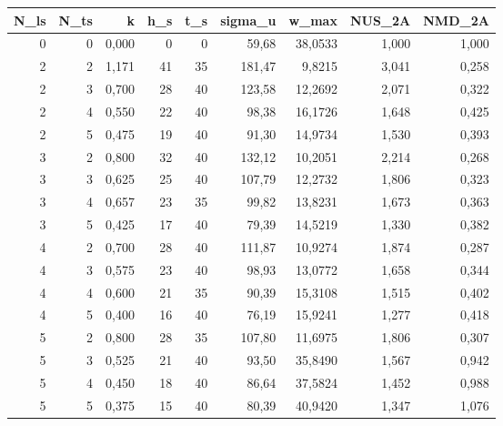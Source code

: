 \begin{tabular}{rrrrrrrrr}
\toprule
N_ls & N_ts & k & h_s & t_s & sigma_u & w_max & NUS_2A & NMD_2A \\ \hline
\midrule
0 & 0 & 0,000 & 0 & 0 & 59,68 & 38,0533 & 1,000 & 1,000 \\ \hline
2 & 2 & 1,171 & 41 & 35 & 181,47 & 9,8215 & 3,041 & 0,258 \\ \hline
2 & 3 & 0,700 & 28 & 40 & 123,58 & 12,2692 & 2,071 & 0,322 \\ \hline
2 & 4 & 0,550 & 22 & 40 & 98,38 & 16,1726 & 1,648 & 0,425 \\ \hline
2 & 5 & 0,475 & 19 & 40 & 91,30 & 14,9734 & 1,530 & 0,393 \\ \hline
3 & 2 & 0,800 & 32 & 40 & 132,12 & 10,2051 & 2,214 & 0,268 \\ \hline
3 & 3 & 0,625 & 25 & 40 & 107,79 & 12,2732 & 1,806 & 0,323 \\ \hline
3 & 4 & 0,657 & 23 & 35 & 99,82 & 13,8231 & 1,673 & 0,363 \\ \hline
3 & 5 & 0,425 & 17 & 40 & 79,39 & 14,5219 & 1,330 & 0,382 \\ \hline
4 & 2 & 0,700 & 28 & 40 & 111,87 & 10,9274 & 1,874 & 0,287 \\ \hline
4 & 3 & 0,575 & 23 & 40 & 98,93 & 13,0772 & 1,658 & 0,344 \\ \hline
4 & 4 & 0,600 & 21 & 35 & 90,39 & 15,3108 & 1,515 & 0,402 \\ \hline
4 & 5 & 0,400 & 16 & 40 & 76,19 & 15,9241 & 1,277 & 0,418 \\ \hline
5 & 2 & 0,800 & 28 & 35 & 107,80 & 11,6975 & 1,806 & 0,307 \\ \hline
5 & 3 & 0,525 & 21 & 40 & 93,50 & 35,8490 & 1,567 & 0,942 \\ \hline
5 & 4 & 0,450 & 18 & 40 & 86,64 & 37,5824 & 1,452 & 0,988 \\ \hline
5 & 5 & 0,375 & 15 & 40 & 80,39 & 40,9420 & 1,347 & 1,076 \\ \hline
\bottomrule
\end{tabular}
